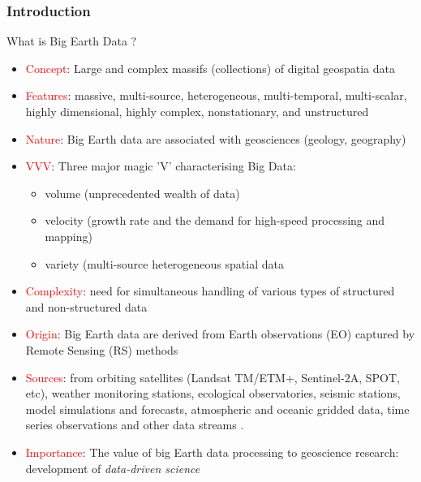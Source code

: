 \documentclass[pdflatex,compress,8pt,
	xcolor={dvipsnames,svgnames,x11names,table},
	hyperref={colorlinks = true,breaklinks = true, urlcolor = NavyBlue}]{beamer}
\begin{document}
\begin{frame}\frametitle{Introduction}
\begin{exampleblock}{What is Big Earth Data ?}
\begin{itemize}
        	\item \textcolor{red}{Concept}: Large and complex massifs (collections) of digital geospatia data
	\item \textcolor{red}{Features}: massive, multi-source, heterogeneous, multi-temporal, multi-scalar, highly dimensional, highly complex, nonstationary, and unstructured \cite{Guo2017}
	\item \textcolor{red}{Nature}: Big Earth data are associated with geosciences (geology, geography)
	\item \textcolor{red}{VVV}: Three major magic 'V' characterising Big Data: 
		\begin{itemize}\small
      		  	\item \textcolor{ProcessBlue}{volume} (unprecedented wealth of data)
			\item \textcolor{ProcessBlue}{velocity} (growth rate and the demand for high-speed processing and mapping)
			\item \textcolor{ProcessBlue}{variety} (multi-source heterogeneous spatial data
		\end{itemize}
	\item \textcolor{red}{Complexity}: need for simultaneous handling of various types of structured and non-structured data \cite{Yangetal2019}
	\item \textcolor{red}{Origin}: Big Earth data are derived from Earth observations (EO) captured by Remote Sensing (RS) methods \cite{Guoetal2016}
	\item \textcolor{red}{Sources}: from orbiting satellites (Landsat TM/ETM+, Sentinel-2A, SPOT, etc), weather monitoring stations, ecological observatories, seismic stations, model simulations and forecasts, atmospheric and oceanic gridded data, time series observations and other data streams \cite{Sellarsetal2013}.
	\item \textcolor{red}{Importance}: The value of big Earth data processing to geoscience research: development of \emph{data-driven science} \cite{Lemenkova202101}
\end{itemize}
\end{exampleblock}

\end{frame}
\end{document}
